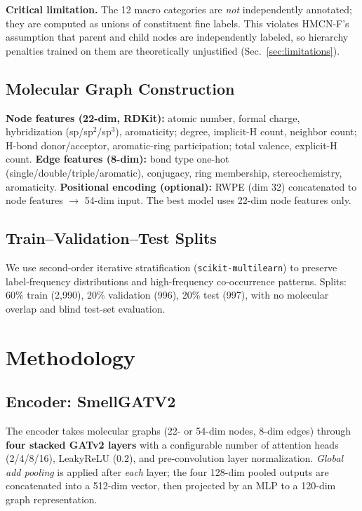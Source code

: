 \documentclass[10pt,twocolumn]{article}
\begin{document}
\noindent\textbf{Critical limitation.} The 12 macro categories are \emph{not} independently annotated; they are computed as unions of constituent fine labels. This violates HMCN-F's assumption that parent and child nodes are independently labeled, so hierarchy penalties trained on them are theoretically unjustified (Sec.~\ref{sec:limitations}).

\subsection{Molecular Graph Construction}
\textbf{Node features (22-dim, RDKit):} atomic number, formal charge, hybridization (sp/sp$^2$/sp$^3$), aromaticity; degree, implicit-H count, neighbor count; H-bond donor/acceptor, aromatic-ring participation; total valence, explicit-H count.
\textbf{Edge features (8-dim):} bond type one-hot (single/double/triple/aromatic), conjugacy, ring membership, stereochemistry, aromaticity.
\textbf{Positional encoding (optional):} RWPE (dim 32) concatenated to node features $\rightarrow$ 54-dim input. The best model uses 22-dim node features only.

\subsection{Train--Validation--Test Splits}
We use second-order iterative stratification (\texttt{scikit-multilearn}) to preserve label-frequency distributions and high-frequency co-occurrence patterns. Splits: 60\% train (2{,}990), 20\% validation (996), 20\% test (997), with no molecular overlap and blind test-set evaluation.

\section{Methodology}

\subsection{Encoder: SmellGATV2}
The encoder takes molecular graphs (22- or 54-dim nodes, 8-dim edges) through \textbf{four stacked GATv2 layers} with a configurable number of attention heads (2/4/8/16), LeakyReLU ($0.2$), and pre-convolution layer normalization. \emph{Global add pooling} is applied after \emph{each} layer; the four 128-dim pooled outputs are concatenated into a 512-dim vector, then projected by an MLP to a 120-dim graph representation.
\end{document}
